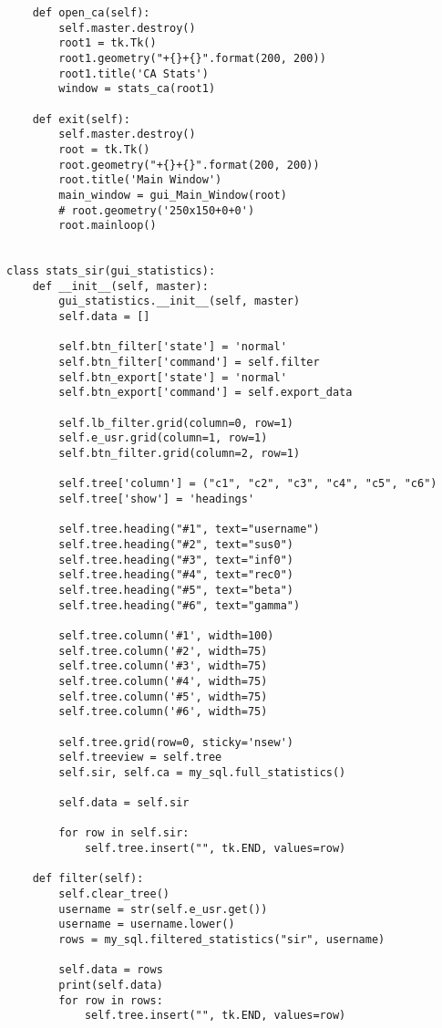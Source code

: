 \documentclass[11pt, a4paper]{article}
\begin{document}
\begin{lstlisting}
    def open_ca(self):
        self.master.destroy()
        root1 = tk.Tk()
        root1.geometry("+{}+{}".format(200, 200))
        root1.title('CA Stats')
        window = stats_ca(root1)

    def exit(self):
        self.master.destroy()
        root = tk.Tk()
        root.geometry("+{}+{}".format(200, 200))
        root.title('Main Window')
        main_window = gui_Main_Window(root)
        # root.geometry('250x150+0+0')
        root.mainloop()


class stats_sir(gui_statistics):
    def __init__(self, master):
        gui_statistics.__init__(self, master)
        self.data = []

        self.btn_filter['state'] = 'normal'
        self.btn_filter['command'] = self.filter
        self.btn_export['state'] = 'normal'
        self.btn_export['command'] = self.export_data

        self.lb_filter.grid(column=0, row=1)
        self.e_usr.grid(column=1, row=1)
        self.btn_filter.grid(column=2, row=1)

        self.tree['column'] = ("c1", "c2", "c3", "c4", "c5", "c6")
        self.tree['show'] = 'headings'

        self.tree.heading("#1", text="username")
        self.tree.heading("#2", text="sus0")
        self.tree.heading("#3", text="inf0")
        self.tree.heading("#4", text="rec0")
        self.tree.heading("#5", text="beta")
        self.tree.heading("#6", text="gamma")

        self.tree.column('#1', width=100)
        self.tree.column('#2', width=75)
        self.tree.column('#3', width=75)
        self.tree.column('#4', width=75)
        self.tree.column('#5', width=75)
        self.tree.column('#6', width=75)

        self.tree.grid(row=0, sticky='nsew')
        self.treeview = self.tree
        self.sir, self.ca = my_sql.full_statistics()

        self.data = self.sir

        for row in self.sir:
            self.tree.insert("", tk.END, values=row)

    def filter(self):
        self.clear_tree()
        username = str(self.e_usr.get())
        username = username.lower()
        rows = my_sql.filtered_statistics("sir", username)

        self.data = rows
        print(self.data)
        for row in rows:
            self.tree.insert("", tk.END, values=row)


\end{lstlisting}
\end{document}
